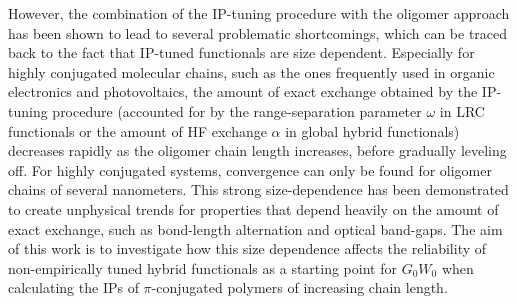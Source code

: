 \documentclass[journal=jctcce,manuscript=article,layout=twocolumn]{achemso}
\begin{document}
However, the combination of the IP-tuning procedure with the oligomer approach has been shown to lead to several problematic shortcomings,\cite{jcp_2012_wPBE_PBEh_BLA_MESIE,jctc_2016_BLA_Ex_thermal,acc_chem_res_2014_tuning_polyene} which can be traced back to the fact that IP-tuned functionals are size dependent.\cite{jcp_2011_range_sep_conj, JChemPhys_Kuemmel_13, phys_rev_let_2016_tuning_lrc_polyene_baer_paper, jcp_2015_piecewise_linearity_solid_state_finite}
Especially for highly conjugated molecular chains, such as the ones frequently used in organic electronics and photovoltaics, the amount of exact exchange obtained by the IP-tuning procedure
(accounted for by the range-separation parameter $\omega$ in LRC functionals or the amount of HF exchange $\alpha$ in global hybrid functionals) decreases rapidly as the oligomer chain length increases, before gradually leveling off.\cite{jcp_2011_range_sep_conj,JChemPhys_Kuemmel_13, acc_chem_res_2014_tuning_polyene, jcp_2012_wPBE_PBEh_BLA_MESIE, phys_rev_let_2016_tuning_lrc_polyene_baer_paper, AccChemRes_Autschbach14, jcp_2015_piecewise_linearity_solid_state_finite} 
For
highly conjugated systems, convergence can only be found for oligomer chains of several nanometers.\cite{phys_rev_let_2016_tuning_lrc_polyene_baer_paper} 
This strong size-dependence has been demonstrated to create unphysical trends for properties that depend heavily on the amount of exact exchange, such as bond-length alternation\cite{jcp_2012_wPBE_PBEh_BLA_MESIE} and optical band-gaps.\cite{jctc_2016_BLA_Ex_thermal} 
The aim of this work is to investigate how this size dependence affects the reliability of non-empirically tuned hybrid functionals as a starting point for $G_0W_0$ when calculating the IPs of $\pi$-conjugated polymers of increasing chain length. 
\end{document}
